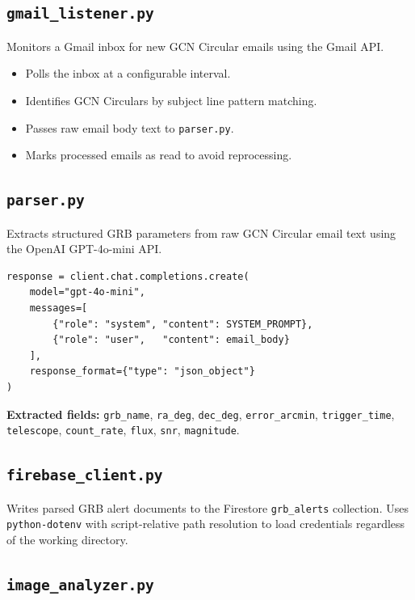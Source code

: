 \documentclass[12pt,a4paper]{article}
\begin{document}
\subsection{\texttt{gmail\_listener.py}}

Monitors a Gmail inbox for new GCN Circular emails using the Gmail API.

\begin{itemize}
    \item Polls the inbox at a configurable interval.
    \item Identifies GCN Circulars by subject line pattern matching.
    \item Passes raw email body text to \texttt{parser.py}.
    \item Marks processed emails as read to avoid reprocessing.
\end{itemize}

\subsection{\texttt{parser.py}}

Extracts structured GRB parameters from raw GCN Circular email text using
the OpenAI GPT-4o-mini API.

\begin{lstlisting}[style=python, caption={Core LLM extraction call}]
response = client.chat.completions.create(
    model="gpt-4o-mini",
    messages=[
        {"role": "system", "content": SYSTEM_PROMPT},
        {"role": "user",   "content": email_body}
    ],
    response_format={"type": "json_object"}
)
\end{lstlisting}

\textbf{Extracted fields:} \texttt{grb\_name}, \texttt{ra\_deg},
\texttt{dec\_deg}, \texttt{error\_arcmin}, \texttt{trigger\_time},
\texttt{telescope}, \texttt{count\_rate}, \texttt{flux}, \texttt{snr},
\texttt{magnitude}.

\subsection{\texttt{firebase\_client.py}}

Writes parsed GRB alert documents to the Firestore \texttt{grb\_alerts}
collection. Uses \texttt{python-dotenv} with script-relative path resolution
to load credentials regardless of the working directory.

\subsection{\texttt{image\_analyzer.py}}
\end{document}
